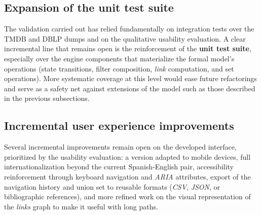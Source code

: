 \subsection*{Expansion of the unit test suite}

The validation carried out has relied fundamentally on integration tests over the TMDB and DBLP
dumps and on the qualitative usability evaluation. A clear incremental line that remains open
is the reinforcement of the \textbf{unit test suite}, especially over the engine components
that materialize the formal model's operations (state transitions, filter composition,
\textit{link} computation, and set operations). More systematic coverage at this level would
ease future refactorings and serve as a safety net against extensions of the model such as
those described in the previous subsections.

\subsection*{Incremental user experience improvements}

Several incremental improvements remain open on the developed interface, prioritized by the
usability evaluation: a version adapted to mobile devices, full internationalization beyond the
current Spanish-English pair, accessibility reinforcement through keyboard navigation and
\textit{ARIA} attributes, export of the navigation history and union set to reusable formats
(\textit{CSV}, \textit{JSON}, or bibliographic references), and more refined work on the visual
representation of the \textit{links} graph to make it useful with long paths.

